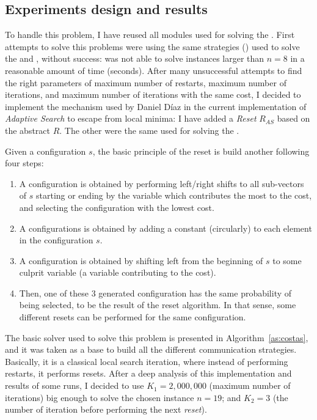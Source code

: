 
\subsection{Experiments design and results}

To handle this problem, I have reused all modules used for solving the \nqp. First attempts to solve this problems were using the same strategies (\ass) used to solve the \sgp{} and \nqp, without success: \posl{} was not able to solve instances larger than $n = 8$ in a reasonable amount of time (seconds). After many unsuccessful attempts to find the right parameters of maximum number of restarts, maximum number of iterations, and maximum number of iterations with the same cost, I decided to implement the mechanism used by Daniel D\'iaz in the current implementation of {\it Adaptive Search} to escape from local minima: I have added a {\it Reset} \om{} $R_{AS}$ based on the abstract \om{} $R$. The other \oms{} were the same used for solving the \nqp.

Given a configuration $s$, the basic principle of the reset is build another following four steps:
\begin{enumerate}
\item A configuration is obtained by performing left/right shifts to all sub-vectors of $s$ starting or ending by the variable which contributes the most to the cost, and selecting the configuration with the lowest cost.
\item A configurations is obtained by adding a constant (circularly) to each element in the configuration $s$.
\item A configuration is obtained by shifting left from the beginning of $s$ to some culprit variable (\ie a variable contributing to the cost).
\item Then, one of these 3 generated configuration has the same probability of being selected, to be the result of the reset algorithm. In that sense, some different resets can be performed for the same configuration.
\end{enumerate}


The basic solver used to solve this problem is presented in Algorithm~\ref{as:costas}, and it was taken as a base to build all the different communication strategies. Basically, it is a classical local search iteration, where instead of performing restarts, it performs resets. After a deep analysis of this implementation and results of some runs, I decided to use $K_1 = 2,000,000$ (maximum number of iterations) big enough to solve the chosen instance $n = 19$; and $K_2 = 3$ (the number of iteration before performing the next \textit{reset}).

